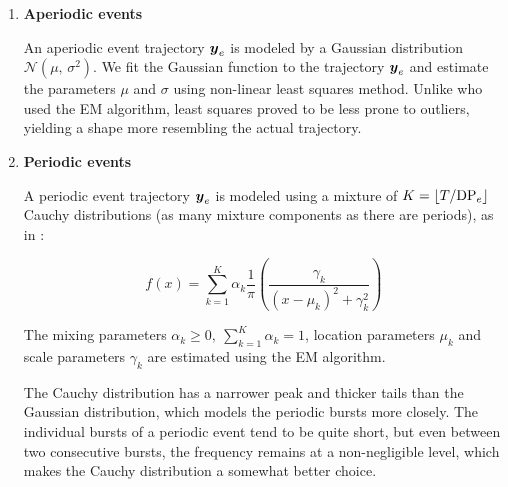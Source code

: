 \begin{enumerate}

\item \textbf{Aperiodic events}

An aperiodic event trajectory $\vect{\traj}_{e}$ is modeled by a Gaussian distribution $\mathcal{N}(\mu,\,\sigma^{2})$. We fit the Gaussian function to the trajectory $\vect{\traj}_{e}$ and estimate the parameters $\mu$ and $\sigma$ using non-linear least squares method. Unlike \cite{event-detection} who used the EM algorithm, least squares proved to be less prone to outliers, yielding a shape more resembling the actual trajectory.

\item \textbf{Periodic events}

A periodic event trajectory $\vect{\traj}_{e}$ is modeled using a mixture of $K = \lfloor T / \text{DP}_{e}\rfloor$ Cauchy distributions (as many mixture components as there are periods), as in \cite{health-events}:

\begin{equation*}
	f(x) = \sum_{k = 1}^{K}{\alpha_{k} \frac{1}{\pi} \left( \frac{\gamma_{k}}{\left( x - \mu_{k} \right)^{2} + \gamma_{k}^{2}} \right)}
\end{equation*}

The mixing parameters $\alpha_{k} \geq 0,\ \sum_{k = 1}^{K}{\alpha_{k}} = 1$, location parameters $\mu_{k}$ and scale parameters $\gamma_{k}$ are estimated using the EM algorithm.

The Cauchy distribution has a narrower peak and thicker tails than the Gaussian distribution, which models the periodic bursts more closely. The individual bursts of a periodic event tend to be quite short, but even between two consecutive bursts, the frequency remains at a non-negligible level, which makes the Cauchy distribution a somewhat better choice.

\end{enumerate}


